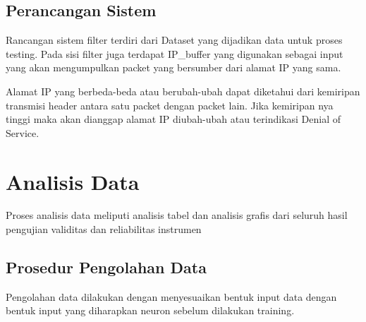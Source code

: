 \documentclass[./skripsi.tex]{subfiles}
\begin{document}
\subsection{Perancangan Sistem}
\par Rancangan sistem filter terdiri dari Dataset yang dijadikan data untuk proses testing. Pada sisi filter juga terdapat IP\_buffer yang digunakan sebagai input yang akan mengumpulkan packet yang bersumber dari alamat IP yang sama.
\par Alamat IP yang berbeda-beda atau berubah-ubah dapat diketahui dari kemiripan transmisi header antara satu packet dengan packet lain. Jika kemiripan nya tinggi maka akan dianggap alamat IP diubah-ubah atau terindikasi Denial of Service.
\begin{center}
\label{svc_loss}
\end{center}
\section{Analisis Data}
\par Proses analisis data meliputi analisis tabel dan analisis grafis dari seluruh hasil pengujian validitas dan reliabilitas instrumen
\subsection{Prosedur Pengolahan Data}
\par Pengolahan data dilakukan dengan menyesuaikan bentuk input data dengan bentuk input yang diharapkan neuron sebelum dilakukan training.
\end{document}
